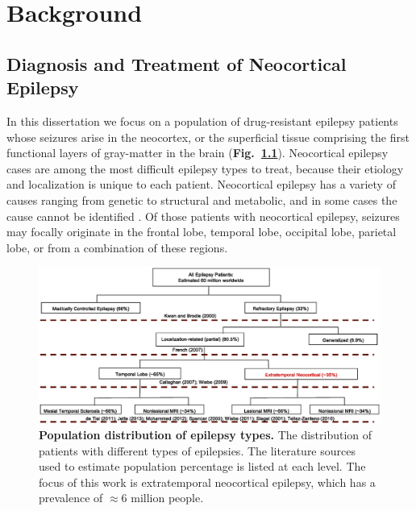 \chapter{Background}
\label{ch:background}

\ifpdf
    \graphicspath{{chapters/ch2_figures/PNG/}{chapters/ch2_figures/PDF/}{chapters/ch2_figures/}}
\else
    \graphicspath{{chapters/ch2_figures/EPS/}{chapters/ch2_figures/}}
\fi



\section{Diagnosis and Treatment of Neocortical Epilepsy}
In this dissertation we focus on a population of drug-resistant epilepsy patients whose seizures arise in the neocortex, or the superficial tissue comprising the first functional layers of gray-matter in the brain (\textbf{Fig.~\ref{epilepsy_type}}). Neocortical epilepsy cases are among the most difficult epilepsy types to treat, because their etiology and localization is unique to each patient. Neocortical epilepsy has a variety of causes ranging from genetic to structural and metabolic, and in some cases the cause cannot be identified \cite{berg2010revised}. Of those patients with neocortical epilepsy, seizures may focally originate in the frontal lobe, temporal lobe, occipital lobe, parietal lobe, or from a combination of these regions.

\begin{figure}
\centering
\includegraphics[width=\textwidth]{epilepsy_type}
\caption[Chart of epilepsy types]{\textbf{Population distribution of epilepsy types.} The distribution of patients with different types of epilepsies. The literature sources used to estimate population percentage is listed at each level. The focus of this work is extratemporal neocortical epilepsy, which has a prevalence of $\approx$6 million people.}
\label{epilepsy_type}
\end{figure}

